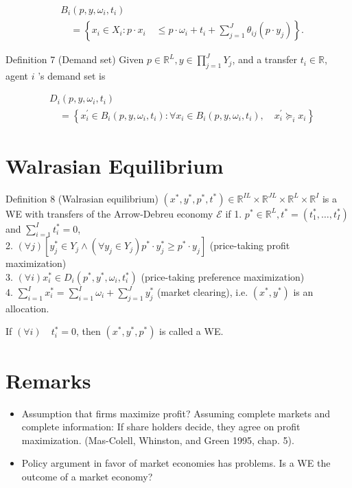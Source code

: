 \documentclass[10pt]{article}
\begin{document}
$$
\begin{aligned}
& B_{i}\left(p, y, \omega_{i}, t_{i}\right) \\
& \quad=\left\{x_{i} \in X_{i}: p \cdot x_{i} \quad \leq p \cdot \omega_{i}+t_{i}+\sum_{j=1}^{J} \theta_{i j}\left(p \cdot y_{j}\right)\right\} .
\end{aligned}
$$

Definition 7 (Demand set) Given $p \in \mathbb{R}^{L}, y \in \prod_{j=1}^{J} Y_{j}$, and a transfer $t_{i} \in \mathbb{R}$, agent $i$ 's demand set is

$$
\begin{aligned}
& D_{i}\left(p, y, \omega_{i}, t_{i}\right) \\
& \quad=\left\{x_{i}^{\prime} \in B_{i}\left(p, y, \omega_{i}, t_{i}\right): \forall x_{i} \in B_{i}\left(p, y, \omega_{i}, t_{i}\right), \quad x_{i}^{\prime} \succeq_{i} x_{i}\right\}
\end{aligned}
$$

\section*{Walrasian Equilibrium}
Definition 8 (Walrasian equilibrium) $\left(x^{*}, y^{*}, p^{*}, t^{*}\right) \in \mathbb{R}^{I L} \times \mathbb{R}^{J L} \times \mathbb{R}^{L} \times \mathbb{R}^{I}$ is a WE with transfers of the Arrow-Debreu economy $\mathcal{E}$ if 1. $p^{*} \in \mathbb{R}^{L}, t^{*}=\left(t_{1}^{*}, \ldots, t_{I}^{*}\right)$ and $\sum_{i=1}^{I} t_{i}^{*}=0$,\\
2. $(\forall j)\left[y_{j}^{*} \in Y_{j} \wedge\left(\forall y_{j} \in Y_{j}\right) p^{*} \cdot y_{j}^{*} \geq p^{*} \cdot y_{j}\right]$ (price-taking profit maximization)\\
3. $(\forall i) x_{i}^{*} \in D_{i}\left(p^{*}, y^{*}, \omega_{i}, t_{i}^{*}\right)$ (price-taking preference maximization)\\
4. $\sum_{i=1}^{I} x_{i}^{*}=\sum_{i=1}^{I} \omega_{i}+\sum_{j=1}^{J} y_{j}^{*}$ (market clearing), i.e. $\left(x^{*}, y^{*}\right)$ is an allocation.

If $(\forall i) \quad t_{i}^{*}=0$, then $\left(x^{*}, y^{*}, p^{*}\right)$ is called a WE.

\section*{Remarks}
\begin{itemize}
  \item Assumption that firms maximize profit? Assuming complete markets and complete information: If share holders decide, they agree on profit maximization. (Mas-Colell, Whinston, and Green 1995, chap. 5).
  \item Policy argument in favor of market economies has problems. Is a WE the outcome of a market economy?
\end{itemize}
\end{document}
